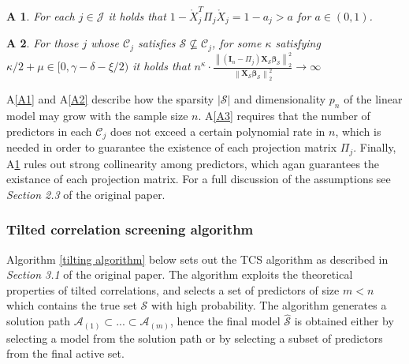 \documentclass[11pt]{report}\usepackage[utf8]{inputenc}
\newtheorem{assump}{A}
\begin{document}
\begin{assump} \label{A5}
    For each $j \in \mathcal{J}$ it holds that $1 - \mathring{X}_j^T\Pi_j\mathring{X}_j = 1 - a_j >  a $ for $a \in \left ( 0,1 \right )$.
\end{assump}

\begin{assump} \label{A6}
    For those $j$ whose $\mathcal{C}_j$ satisfies $\mathcal{S} \nsubseteq \mathcal{C}_j$, for some $\kappa$ satisfying $\kappa/2 + \mu \in [0, \gamma - \delta - \xi/2)$ it holds that $n^\kappa \cdot \frac{\left \| \left ( \boldsymbol{I}_n-\Pi_j \right )\boldsymbol{X}_\mathcal{S}\boldsymbol{\beta}_\mathcal{S} \right \|_2^2}{\left \| \boldsymbol{X}_\mathcal{S}\boldsymbol{\beta}_\mathcal{S} \right \|_2^2} \rightarrow \infty$
\end{assump}

A\ref{A1} and A\ref{A2} describe how the sparsity $|\mathcal{S}|$ and dimensionality $p_n$ of the linear model may grow with the sample size $n$. A\ref{A3} requires that the number of predictors in each $\mathcal{C}_j$ does not exceed a certain polynomial rate in $n$, which is needed in order to guarantee the existence of each projection matrix $\Pi_j$. Finally, A\ref{A5} rules out strong collinearity among predictors, which agan guarantees the existance of each projection matrix. For a full discussion of the assumptions see \textit{Section 2.3} of the original paper. 

\subsubsection{Tilted correlation screening algorithm}

Algorithm \ref{tilting algorithm} below sets out the TCS algorithm  as described in \textit{Section 3.1} of the original paper. The algorithm exploits the theoretical properties of tilted correlations, and selects a set of predictors of size $m<n$ which contains the true set $\mathcal{S}$ with high probability. The algorithm generates a solution path $\mathcal{A}_{(1)} \subset ... \subset \mathcal{A}_{(m)}$, hence the final model $\widehat{\mathcal{S}}$ is obtained either by selecting a model from the solution path or by selecting a subset of predictors from the final active set. 

\bigskip
\end{document}
